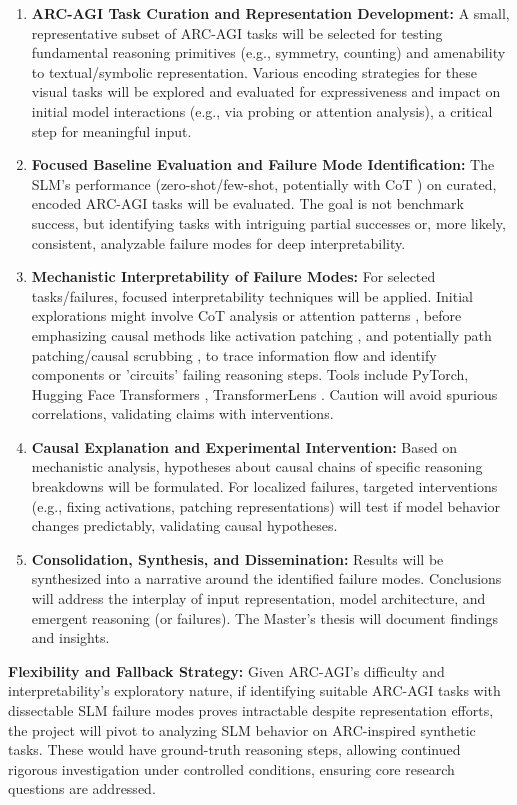 \documentclass[12pt,a4paper]{article}
\begin{document}
\begin{enumerate}
    \item \textbf{ARC-AGI Task Curation and Representation Development:} A small, representative subset of ARC-AGI tasks \parencite{chollet2019measure, arc2024} will be selected for testing fundamental reasoning primitives (e.g., symmetry, counting) and amenability to textual/symbolic representation. Various encoding strategies for these visual tasks will be explored and evaluated for expressiveness and impact on initial model interactions (e.g., via probing or attention analysis), a critical step for meaningful input.
    \item \textbf{Focused Baseline Evaluation and Failure Mode Identification:} The SLM's performance (zero-shot/few-shot, potentially with CoT \parencite{wei2023chainofthoughtpromptingelicitsreasoning}) on curated, encoded ARC-AGI tasks will be evaluated. The goal is not benchmark success, but identifying tasks with intriguing partial successes or, more likely, consistent, analyzable failure modes for deep interpretability.
    \item \textbf{Mechanistic Interpretability of Failure Modes:} For selected tasks/failures, focused interpretability techniques will be applied. Initial explorations might involve CoT analysis or attention patterns \parencite{vig2019analyzing}, before emphasizing causal methods like activation patching \parencite{zhang2024bestpracticesactivationpatching, dumas2024how, nanda2023factfinding}, and potentially path patching/causal scrubbing \parencite{nanda2023progress, elhage2021mathematical}, to trace information flow and identify components or 'circuits' \parencite{olah2020zoom} failing reasoning steps. Tools include PyTorch, Hugging Face Transformers \parencite{wolf2020transformers}, TransformerLens \parencite{nanda2022transformerlens}. Caution will avoid spurious correlations, validating claims with interventions.
    \item \textbf{Causal Explanation and Experimental Intervention:} Based on mechanistic analysis, hypotheses about causal chains of specific reasoning breakdowns will be formulated. For localized failures, targeted interventions (e.g., fixing activations, patching representations) will test if model behavior changes predictably, validating causal hypotheses.
    \item \textbf{Consolidation, Synthesis, and Dissemination:} Results will be synthesized into a narrative around the identified failure modes. Conclusions will address the interplay of input representation, model architecture, and emergent reasoning (or failures). The Master's thesis will document findings and insights.
\end{enumerate}
\textbf{Flexibility and Fallback Strategy:} Given ARC-AGI's difficulty and interpretability's exploratory nature, if identifying suitable ARC-AGI tasks with dissectable SLM failure modes proves intractable despite representation efforts, the project will pivot to analyzing SLM behavior on ARC-inspired synthetic tasks. These would have ground-truth reasoning steps, allowing continued rigorous investigation under controlled conditions, ensuring core research questions are addressed.
\end{document}
